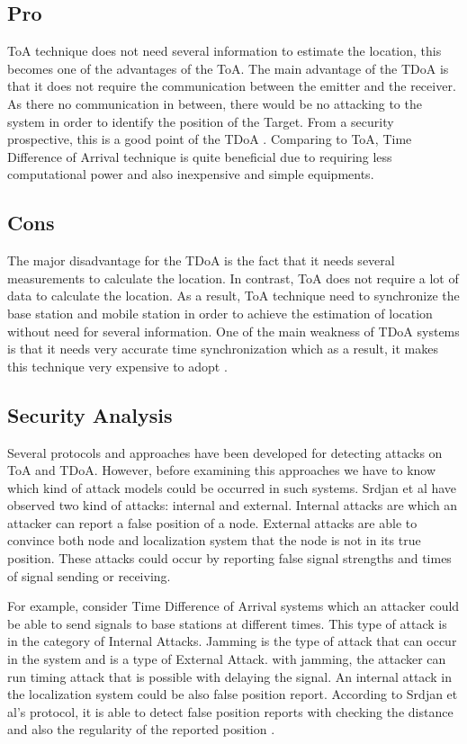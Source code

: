\subsection{Pro}
ToA technique does not need several information to estimate the location, this becomes one of the advantages of the ToA. The main advantage of the TDoA is that it does not require the communication between the emitter and the receiver. As there no communication in between, there would be no attacking to the system in order to identify the position of the Target. From a security prospective, this is a good point of the TDoA \cite{schaefer18}. Comparing to ToA, Time Difference of Arrival technique is quite beneficial due to requiring less computational power and also inexpensive and simple equipments.


\subsection{Cons}
The major disadvantage for the TDoA is the fact that it needs several measurements to calculate the location. In contrast, ToA does not require a lot of data to calculate the location. As a result, ToA technique need to synchronize the base station and mobile station in order to achieve the estimation of location without need for several information. One of the main weakness of TDoA systems is that it needs very accurate time synchronization which as a result, it makes this technique very expensive to adopt \cite{gante13}.

\subsection{Security Analysis}
Several protocols and approaches have been developed for detecting attacks on ToA and TDoA. However, before examining this approaches we have to know which kind of attack models could be occurred in such systems. Srdjan et al \cite{srivastava}have observed two kind of attacks: internal and external. Internal attacks are which an attacker can report a false position of a node. External attacks are able to convince both node and localization system that the node is not in its true position. These attacks could occur by reporting
false signal strengths and times of signal sending or receiving.

For example, consider Time Difference of Arrival systems which an attacker could be able to send signals to base stations at different times. This type of attack is in the category of Internal Attacks. Jamming is the type of attack that can occur in the system and is a type of External Attack. with jamming, the attacker can run timing attack that is possible with delaying the signal. An internal attack in the localization system could be also false position report. According to Srdjan et al's protocol, it is able to detect false position reports with checking the distance and also the regularity of the reported position \cite{srivastava}.

